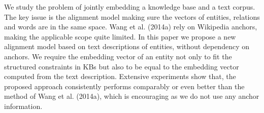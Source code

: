 We study the problem of jointly embedding a knowledge base and a text corpus. The key issue is the alignment model making sure the vectors of entities, relations and words are in the same space. Wang et al. (2014a) rely on Wikipedia anchors, making the applicable scope quite limited. In this paper we propose a new alignment model based on text descriptions of entities, without dependency on anchors. We require the embedding vector of an entity not only to fit the structured constraints in KBs but also to be equal to the embedding vector computed from the text description. Extensive experiments show that, the proposed approach consistently performs comparably or even better than the method of Wang et al. (2014a), which is encouraging as we do not use any anchor information.
